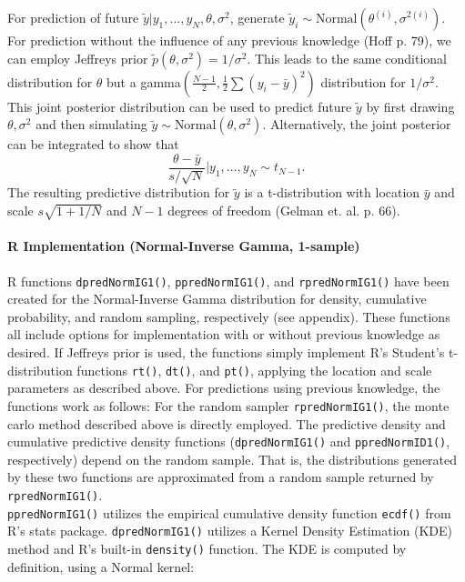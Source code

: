 \documentclass[12pt, a4paper]{article}
\begin{document}
\noindent For prediction of future $\tilde{y}|y_1,...,y_N,\theta,\sigma^2$, generate $\tilde{y}_i \sim \text{Normal}\left(\theta^{(i)},\sigma^{2(i)}\right)$.\\

\noindent For prediction without the influence of any previous knowledge (Hoff p. 79), we can employ Jeffreys prior $\tilde{p}\left(\theta,\sigma^2\right) = 1/\sigma^2$.  This leads to the same conditional distribution for $\theta$ but a gamma$\left(\frac{N-1}{2},\frac{1}{2}\sum\left(y_i - \bar{y}\right)^2\right)$ distribution for $1/\sigma^2$.  This joint posterior distribution can be used to predict future $\tilde{y}$ by first drawing $\theta,\sigma^2$ and then simulating $\tilde{y}\sim\text{Normal}\left(\theta,\sigma^2\right)$.   Alternatively, the joint posterior can be integrated to show that
        $$\dfrac{\theta-\bar{y}}{s/\sqrt{N}}|y_1,...,y_N\sim t_{N-1}.$$
\noindent The resulting predictive distribution for $\tilde{y}$ is a t-distribution with location $\bar{y}$ and scale $s\sqrt{1+1/N}$ and $N-1$ degrees of freedom (Gelman et. al. p. 66).


      \paragraph{R Implementation (Normal-Inverse Gamma, 1-sample)}
      R functions \texttt{dpredNormIG1()}, \texttt{ppredNormIG1()}, and \texttt{rpredNormIG1()} have been created for the Normal-Inverse Gamma distribution for density, cumulative probability, and random sampling, respectively (see appendix).  These functions all include options for implementation with or without previous knowledge as desired.  If Jeffreys prior is used, the functions simply implement R's Student's t-distribution functions \texttt{rt()}, \texttt{dt()}, and \texttt{pt()}, applying the location and scale parameters as described above.  For predictions using previous knowledge, the functions work as follows:  For the random sampler \texttt{rpredNormIG1()}, the monte carlo method described above is directly employed.  The predictive density and cumulative predictive density functions (\texttt{dpredNormIG1()} and \texttt{ppredNormID1()}, respectively) depend on the random sample. That is, the distributions generated by these two functions are approximated from a random sample returned by \texttt{rpredNormIG1()}.\\

\noindent\texttt{ppredNormIG1()} utilizes the empirical cumulative density function \texttt{ecdf()} from R's stats package.  \texttt{dpredNormIG1()} utilizes a Kernel Density Estimation (KDE) method and R's built-in \texttt{density()} function.  The KDE is computed by definition, using a Normal kernel:
\end{document}
